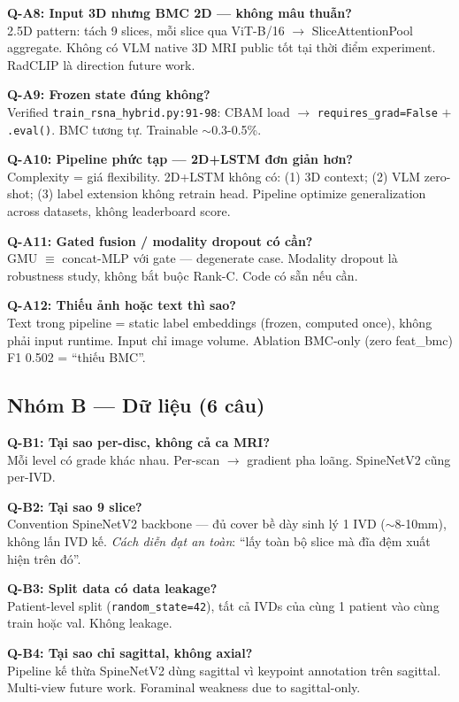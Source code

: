 \documentclass[11pt,a4paper]{article}
\begin{document}
\textbf{Q-A8: Input 3D nhưng BMC 2D --- không mâu thuẫn?}\\
2.5D pattern: tách 9 slices, mỗi slice qua ViT-B/16 $\to$
SliceAttentionPool aggregate. Không có VLM native 3D MRI public tốt
tại thời điểm experiment. RadCLIP là direction future work.

\textbf{Q-A9: Frozen state đúng không?}\\
Verified \verb|train_rsna_hybrid.py:91-98|: CBAM load $\to$
\verb|requires_grad=False| $+$ \verb|.eval()|. BMC tương tự. Trainable
$\sim$0.3-0.5\%.

\textbf{Q-A10: Pipeline phức tạp --- 2D+LSTM đơn giản hơn?}\\
Complexity = giá flexibility. 2D+LSTM không có: (1) 3D context;
(2) VLM zero-shot; (3) label extension không retrain head. Pipeline
optimize generalization across datasets, không leaderboard score.

\textbf{Q-A11: Gated fusion / modality dropout có cần?}\\
GMU $\equiv$ concat-MLP với gate --- degenerate case. Modality dropout
là robustness study, không bắt buộc Rank-C. Code có sẵn nếu cần.

\textbf{Q-A12: Thiếu ảnh hoặc text thì sao?}\\
Text trong pipeline = static label embeddings (frozen, computed once),
không phải input runtime. Input chỉ image volume. Ablation BMC-only
(zero feat\_bmc) F1 0.502 = ``thiếu BMC''.

\subsection*{Nhóm B — Dữ liệu (6 câu)}

\textbf{Q-B1: Tại sao per-disc, không cả ca MRI?}\\
Mỗi level có grade khác nhau. Per-scan $\to$ gradient pha loãng. SpineNetV2 cũng per-IVD.

\textbf{Q-B2: Tại sao 9 slice?}\\
Convention SpineNetV2 backbone --- đủ cover bề dày sinh lý 1 IVD
($\sim$8-10mm), không lấn IVD kế. \emph{Cách diễn đạt an toàn}: ``lấy
toàn bộ slice mà đĩa đệm xuất hiện trên đó''.

\textbf{Q-B3: Split data có data leakage?}\\
Patient-level split (\verb|random_state=42|), tất cả IVDs của cùng 1
patient vào cùng train hoặc val. Không leakage.

\textbf{Q-B4: Tại sao chỉ sagittal, không axial?}\\
Pipeline kế thừa SpineNetV2 dùng sagittal vì keypoint annotation trên
sagittal. Multi-view future work. Foraminal weakness due to
sagittal-only.
\end{document}

